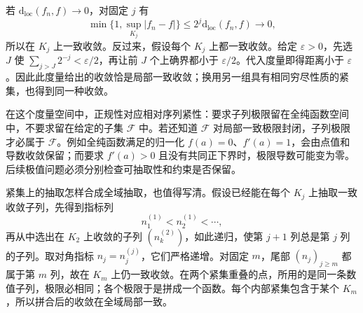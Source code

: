 \ProseParagraphBreak

若 \(\mathrm d_{\mathrm{loc}}(f_n,f)\to0\)，对固定 \(j\) 有
\[
 \min\{1,\sup_{K_j}|f_n-f|\}
 \le 2^j\mathrm d_{\mathrm{loc}}(f_n,f)\longrightarrow0,
\]
所以在 \(K_j\) 上一致收敛。反过来，假设每个 \(K_j\) 上都一致收敛。给定 \(\varepsilon>0\)，先选 \(J\) 使 \(\sum_{j>J}2^{-j}<\varepsilon/2\)，再让前 \(J\) 个上确界都小于 \(\varepsilon/2\)。代入度量即得距离小于 \(\varepsilon\)。因此此度量给出的收敛恰是局部一致收敛；换用另一组具有相同穷尽性质的紧集，也得到同一种收敛。

\ProseParagraphBreak

在这个度量空间中，正规性对应相对序列紧性：要求子列极限留在全纯函数空间中，不要求留在给定的子集 \(\mathcal F\) 中。若还知道 \(\mathcal F\) 对局部一致极限封闭，子列极限才必属于 \(\mathcal F\)。例如全纯函数满足的归一化 \(f(a)=0\)、\(f'(a)=1\)，会由点值和导数收敛保留；而要求 \(f'(a)>0\) 且没有共同正下界时，极限导数可能变为零。后续极值问题必须分别检查可抽取性和约束是否保留。

\ProseParagraphBreak

紧集上的抽取怎样合成全域抽取，也值得写清。假设已经能在每个 \(K_j\) 上抽取一致收敛子列，先得到指标列
\[
 n_1^{(1)}<n_2^{(1)}<\cdots,
\]
再从中选出在 \(K_2\) 上收敛的子列 \((n_k^{(2)})\)，如此递归，使第 \(j+1\) 列总是第 \(j\) 列的子列。取对角指标 \(n_j=n_j^{(j)}\)，它们严格递增。对固定 \(m\)，尾部 \((n_j)_{j\ge m}\) 都属于第 \(m\) 列，故在 \(K_m\) 上仍一致收敛。在两个紧集重叠的点，所用的是同一条数值子列，极限必相同；各个极限于是拼成一个函数。每个内部紧集包含于某个 \(K_m\)，所以拼合后的收敛在全域局部一致。

\ProseParagraphBreak

